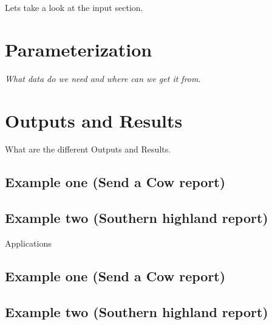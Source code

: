 \documentclass[
]{book}
\begin{document}
Lets take a look at the input section.

\hypertarget{parameterization}{%
\chapter{Parameterization}\label{parameterization}}

\emph{What data do we need and where can we get it from}.

\hypertarget{outputs-and-results}{%
\chapter{Outputs and Results}\label{outputs-and-results}}

What are the different Outputs and Results.

\hypertarget{example-one-send-a-cow-report}{%
\section{Example one (Send a Cow report)}\label{example-one-send-a-cow-report}}

\hypertarget{example-two-southern-highland-report}{%
\section{Example two (Southern highland report)}\label{example-two-southern-highland-report}}

Applications

\hypertarget{example-one-send-a-cow-report-1}{%
\section{Example one (Send a Cow report)}\label{example-one-send-a-cow-report-1}}

\hypertarget{example-two-southern-highland-report-1}{%
\section{Example two (Southern highland report)}\label{example-two-southern-highland-report-1}}

  
\end{document}
